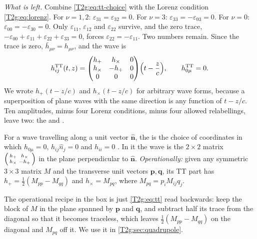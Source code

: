\emph{What is left.} Combine \eqref{T2g:eq:tt-choice} with the Lorenz condition \eqref{T2g:eq:lorenz}. For $\nu=1,2$: $\varepsilon_{31}=\varepsilon_{32}=0$. For $\nu=3$: $\varepsilon_{33}=-\varepsilon_{03}=0$. For $\nu=0$: $\varepsilon_{00}=-\varepsilon_{30}=0$. Only $\varepsilon_{11}$, $\varepsilon_{12}$ and $\varepsilon_{22}$ survive, and the zero trace, $-\varepsilon_{00}+\varepsilon_{11}+\varepsilon_{22}+\varepsilon_{33}=0$, forces $\varepsilon_{22}=-\varepsilon_{11}$. Two numbers remain. Since the trace is zero, $\bar h_{\mu\nu}=h_{\mu\nu}$, and the wave is
\begin{equation}
  h_{ij}^{\rm TT}(t,z)=
  \begin{pmatrix} h_+ & h_\times & 0\\ h_\times & -h_+ & 0\\ 0&0&0\end{pmatrix}\!\Big(t-\frac zc\Big),
  \qquad h_{0\mu}^{\rm TT}=0 .
  \label{T2g:eq:tt}
\end{equation}
We wrote $h_+(t-z/c)$ and $h_\times(t-z/c)$ for arbitrary wave forms, because a superposition of plane waves with the same direction is any function of $t-z/c$. Ten amplitudes, minus four Lorenz conditions, minus four allowed relabellings, leave two: the  and  \cite[Sec.~1.2]{Maggiore2007}.

\begin{workdef}
For a wave travelling along a unit vector $\hat{\bm n}$, the  is the choice of coordinates in which $h_{0\mu}=0$, $h_{ij}\hat n_j=0$  and $h_{ii}=0$ . In it the wave is the $2\times2$ matrix $\begin{psmallmatrix}h_+&h_\times\\h_\times&-h_+\end{psmallmatrix}$ in the plane perpendicular to $\hat{\bm n}$. \emph{Operationally:} given any symmetric $3\times3$ matrix $M$ and the transverse unit vectors $\bm p,\bm q$, its TT part has $h_+=\tfrac12(M_{pp}-M_{qq})$ and $h_\times=M_{pq}$, where $M_{pq}=p_iM_{ij}q_j$.
\end{workdef}
The operational recipe in the box is just \eqref{T2g:eq:tt} read backwards: keep the block of $M$ in the plane spanned by $\bm p$ and $\bm q$, and subtract half its trace from the diagonal so that it becomes traceless, which leaves $\tfrac12(M_{pp}-M_{qq})$ on the diagonal and $M_{pq}$ off it. We use it in \cref{T2g:sec:quadrupole}.

